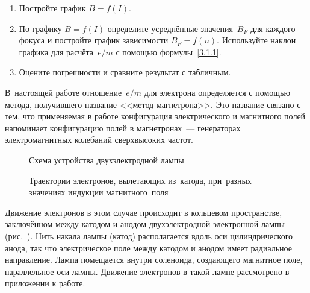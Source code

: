 \begin{lab:task}

\begin{enumerate}
\item{Постройте график $B=f(I)$.}
\item{По графику $B=f(I)$ определите усреднённые значения~$B_F$ для каждого
фокуса и постройте график зависимости $B_F=f(n)$. Используйте наклон графика для
расчёта~$e/m$ с помощью формулы~\eqref{3.1.1}.}
\item{Оцените погрешности и сравните результат с табличным.}

\end{enumerate}
\end{lab:task}



В~настоящей работе отношение~$e/m$ для электрона определяется с помощью метода,
получившего название <<метод
магнетрона>>. Это название связано с тем, что применяемая в работе конфигурация
электрического и магнитного полей
напоминает конфигурацию полей в магнетронах~--- генераторах электромагнитных
колебаний сверхвысоких частот.

\begin{figure}[h!]
	\begin{minipage}[b]{0.49\textwidth}
		\caption{Схема устройства двухэлектродной лампы}
	\end{minipage}
	\hfill
	\begin{minipage}[b]{0.49\textwidth}
		\caption{Траектории электронов, вылетающих из~катода, при~разных
значениях индукции магнитного~поля}
	\end{minipage}
\end{figure}

Движение электронов в этом случае происходит в кольцевом пространстве,
заключённом между катодом и анодом
двухэлектродной электронной лампы (рис.~). Нить
накала лампы (катод) располагается вдоль оси цилиндрического анода, так что
электрическое поле между катодом и анодом имеет радиальное направление. Лампа
помещается внутри соленоида, создающего магнитное поле, параллельное оси лампы.
Движение электронов в такой лампе рассмотрено в приложении к работе.

